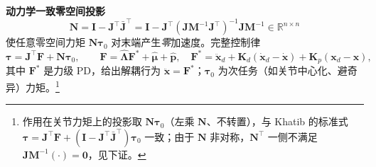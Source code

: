 \begin{theorem}[零空间力矩对末端零加速度]
\label{thm:actrl-null}
\textbf{动力学一致零空间投影}
\begin{equation}
  \boxed{\mathbf{N}=\mathbf{I}-\mathbf{J}^\top\bar{\mathbf{J}}^\top=\mathbf{I}-\mathbf{J}^\top(\mathbf{J}\mathbf{M}^{-1}\mathbf{J}^\top)^{-1}\mathbf{J}\mathbf{M}^{-1}\in\mathbb{R}^{n\times n}}
  \label{eq:actrl-N}
\end{equation}
使任意零空间力矩 $\mathbf{N}\boldsymbol{\tau}_0$ 对末端产生\emph{零}加速度。完整控制律
\begin{equation}
  \boldsymbol{\tau}=\mathbf{J}^\top\mathbf{F}+\mathbf{N}\boldsymbol{\tau}_0,\qquad
  \mathbf{F}=\hat{\boldsymbol{\Lambda}}\mathbf{F}^*+\hat{\boldsymbol{\mu}}+\hat{\mathbf{p}},\quad
  \mathbf{F}^*=\ddot{\mathbf{x}}_d+\mathbf{K}_d(\dot{\mathbf{x}}_d-\dot{\mathbf{x}})+\mathbf{K}_p(\mathbf{x}_d-\mathbf{x}),
  \label{eq:actrl-osc-law}
\end{equation}
其中 $\mathbf{F}^*$ 是力级 PD，给出解耦行为 $\ddot{\mathbf{x}}=\mathbf{F}^*$；$\boldsymbol{\tau}_0$ 为次任务（如关节中心化、避奇异）力矩。\footnote{作用在关节力矩上的投影取 $\mathbf{N}\boldsymbol{\tau}_0$（左乘 $\mathbf{N}$、不转置），与 Khatib\cite{khatib1987operational} 的标准式 $\boldsymbol{\tau}=\mathbf{J}^\top\mathbf{F}+(\mathbf{I}-\mathbf{J}^\top\bar{\mathbf{J}}^\top)\boldsymbol{\tau}_0$ 一致；由于 $\mathbf{N}$ 非对称，$\mathbf{N}^\top$ 一侧不满足 $\mathbf{J}\mathbf{M}^{-1}(\cdot)=\mathbf{0}$，见下证。}
\end{theorem}
